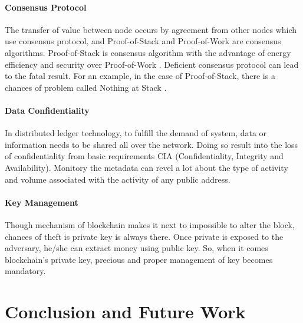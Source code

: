 \documentclass[a4paper,twoside,12pt]{report}
\begin{document}
\begin{spacing}{1.5}
\subsubsection{Consensus Protocol}
The transfer of value between node occurs by agreement from other nodes which use consensus protocol, and
Proof-of-Stack and Proof-of-Work are consensus algorithms. Proof-of-Stack is consensus algorithm with the advantage of energy efficiency and security over Proof-of-Work \cite{saad_exploring_2019}. Deficient consensus protocol can lead to the fatal result. For an example, in the case of Proof-of-Stack, there is a chances of  problem called Nothing at Stack \cite{wiki:proofofwork}.  
\subsubsection{Data Confidentiality}
In distributed ledger technology, to fulfill the demand of system, data or information needs to be shared all over the network. Doing so result into the loss of confidentiality from basic requirements CIA (Confidentiality, Integrity and Availability). Monitory the metadata can revel a lot about the type of activity and volume associated with the activity of any public address.
\subsubsection{Key Management}
Though mechanism of blockchain makes it next to impossible to alter the block, chances of theft is private key is always there. Once private is exposed to the adversary, he/she can extract money using public key. So, when it comes blockchain's private key, precious and proper management of key becomes mandatory.
\chapter{Conclusion and Future Work}
\label{chaper4}
\end{spacing}
\begin{appendices}
\end{appendices}



\end{document}

